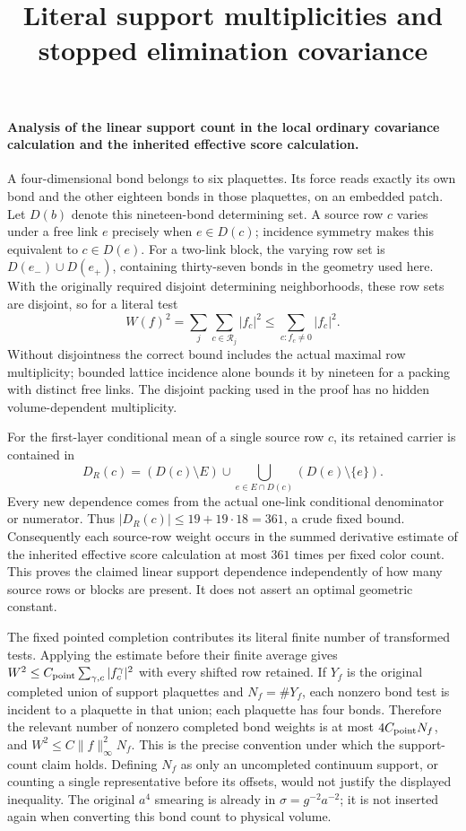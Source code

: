 \documentclass[11pt]{article}
\title{Literal support multiplicities and stopped elimination covariance}\author{}\date{}
\begin{document}
\maketitle
\paragraph{Analysis of the linear support count in the local ordinary covariance calculation and the inherited effective score calculation.}
A four-dimensional bond belongs to six plaquettes. Its force reads exactly its own bond
and the other eighteen bonds in those plaquettes, on an embedded patch. Let $D(b)$ denote
this nineteen-bond determining set. A source row $c$ varies under a free link $e$ precisely
when $e\in D(c)$; incidence symmetry makes this equivalent to $c\in D(e)$.
For a two-link block, the varying row set is $D(e_-)\cup D(e_+)$, containing thirty-seven
bonds in the geometry used here. With the originally required disjoint determining
neighborhoods, these row sets are disjoint, so for a literal test
\[
 W(f)^2=\sum_j\sum_{c\in\mathcal R_j}|f_c|^2
 \le\sum_{c:f_c\ne0}|f_c|^2.
\]
Without disjointness the correct bound includes the actual maximal row multiplicity;
bounded lattice incidence alone bounds it by nineteen for a packing with distinct free links.
The disjoint packing used in the proof has no hidden volume-dependent multiplicity.

For the first-layer conditional mean of a single source row $c$, its retained carrier is
contained in
\[
 D_R(c)=(D(c)\setminus E)\cup
       \bigcup_{e\in E\cap D(c)}(D(e)\setminus\{e\}).
\]
Every new dependence comes from the actual one-link conditional denominator or numerator.
Thus $|D_R(c)|\le19+19\cdot18=361$, a crude fixed bound. Consequently each source-row
weight occurs in the summed derivative estimate of the inherited effective score calculation at most $361$ times per fixed
color count. This proves the claimed linear support dependence independently of how
many source rows or blocks are present. It does not assert an optimal geometric constant.

The fixed pointed completion contributes its literal finite number of transformed tests.
Applying the estimate before their finite average gives
$W^2\le C_{\rm point}\sum_{\gamma,c}|f_c^\gamma|^2$ with every shifted row retained.
If $Y_f$ is the original completed union of support plaquettes and $N_f=\#Y_f$, each
nonzero bond test is incident to a plaquette in that union; each plaquette has four bonds.
Therefore the relevant number of nonzero completed bond weights is at most
$4C_{\rm point}N_f$, and
$W^2\le C\|f\|_\infty^2N_f$. This is the precise convention under which the support-count
claim holds. Defining $N_f$ as only an uncompleted continuum support, or counting a
single representative before its offsets, would not justify the displayed inequality.
The original $a^4$ smearing is already in $\sigma=g^{-2}a^{-2}$; it is not inserted again
when converting this bond count to physical volume.
\end{document}
